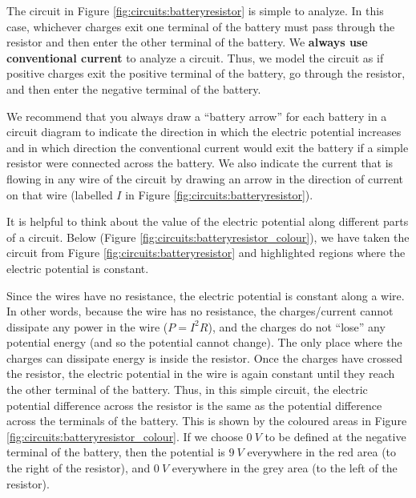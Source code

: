 
The circuit in Figure \ref{fig:circuits:batteryresistor} is simple to analyze. In this case, whichever charges exit one terminal of the battery must pass through the resistor and then enter the other terminal of the battery. We \textbf{always use conventional current} to analyze a circuit. Thus, we model the circuit as if positive charges exit the positive terminal of the battery, go through the resistor, and then enter the negative terminal of the battery.

We recommend that you always draw a ``battery arrow'' for each battery in a circuit diagram to indicate the direction in which the electric potential increases and in which direction the conventional current would exit the battery if a simple resistor were connected across the battery. We also indicate the current that is flowing in any wire of the circuit by drawing an arrow in the direction of current on that wire (labelled $I$ in Figure \ref{fig:circuits:batteryresistor}).

It is helpful to think about the value of the electric potential along different parts of a circuit. Below (Figure \ref{fig:circuits:batteryresistor_colour}), we have taken the circuit from Figure \ref{fig:circuits:batteryresistor} and highlighted regions where the electric potential is constant.

Since the wires have no resistance, the electric potential is constant along a wire. In other words, because the wire has no resistance, the charges/current cannot dissipate any power in the wire ($P=I^2R$), and the charges do not ``lose'' any potential energy (and so the potential cannot change). The only place where the charges can dissipate energy is inside the resistor. Once the charges have crossed the resistor, the electric potential in the wire is again constant until they reach the other terminal of the battery. Thus, in this simple circuit, the electric potential difference across the resistor is the same as the potential difference across the terminals of the battery.  This is shown by the coloured areas in Figure \ref{fig:circuits:batteryresistor_colour}. If we choose $\SI{0}{V}$ to be defined at the negative terminal of the battery, then the potential is $\SI{9}{V}$ everywhere in the red area (to the right of the resistor), and $\SI{0}{V}$ everywhere in the grey area (to the left of the resistor). 


